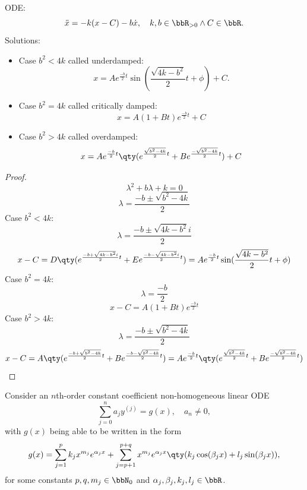 \documentclass[a4paper,12pt]{report}
\begin{document}
ODE:
\[\ddot{x}=-k(x-C)-b\dot{x},\quad k,b\in\bbR_{>0}\land C\in\bbR.\]
Solutions:
\begin{itemize}
\item Case $b^2<4k$ called underdamped:
\[x=Ae^{\frac{-b}{2}t}\sin(\frac{\sqrt{4k-b^2}}{2}t+\phi)+C.\]
\item Case $b^2=4k$ called critically damped:
\[x=A(1+Bt)e^{\frac{-b}{2}t}+C\]
\item Case $b^2>4k$ called overdamped:
\[x=Ae^{\frac{-b}{2}t}\qty(e^{\frac{\sqrt{b^2-4k}}{2}t}+Be^{\frac{-\sqrt{b^2-4k}}{2}t})+C\]
\end{itemize}
\begin{proof}
\[\lambda^2+b\lambda+k=0\]
\[\lambda=\frac{-b\pm\sqrt{b^2-4k}}{2}\]
Case $b^2<4k$:
\[\lambda=\frac{-b\pm\sqrt{4k-b^2}i}{2}\]
\[x-C=D\qty(e^{\frac{-b+\sqrt{4k-b^2}i}{2}t}+Ee^{\frac{-b-\sqrt{4k-b^2}i}{2}t})=Ae^{\frac{-b}{2}t}\sin(\frac{\sqrt{4k-b^2}}{2}t+\phi)\]
Case $b^2=4k$:
\[\lambda=\frac{-b}{2}\]
\[x-C=A(1+Bt)e^{\frac{-b}{2}t}\]
Case $b^2>4k$:
\[\lambda=\frac{-b\pm\sqrt{b^2-4k}}{2}\]
\[x-C=A\qty(e^{\frac{-b+\sqrt{b^2-4k}}{2}t}+Be^{\frac{-b-\sqrt{b^2-4k}}{2}t})=Ae^{\frac{-b}{2}t}\qty(e^{\frac{\sqrt{b^2-4k}}{2}t}+Be^{\frac{-\sqrt{b^2-4k}}{2}t})\]
\end{proof}
Consider an $n$th-order constant coefficient non-homogeneous linear ODE
\[\sum_{j=0}^na_jy^{(j)}=g(x),\quad a_n\neq 0,\]
with $g(x)$ being able to be written in the form
\[g(x)=\sum_{j=1}^pk_jx^{m_j}e^{\alpha_jx}+\sum_{j=p+1}^{p+q}x^{m_j}e^{\alpha_jx}\qty(k_j\cos(\beta_jx)+l_j\sin(\beta_jx)),\]
for some constants $p,q,m_j\in\bbN_0$ and $\alpha_j,\beta_j,k_j,l_j\in\bbR$.
\end{document}
